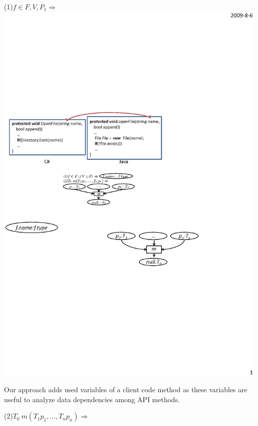 (1)$f\in F , V , P_1 \Rightarrow $
\includegraphics[scale=0.7,clip]{figure/rule1.eps}%

Our approach adds used variables of a client code method as these
variables are useful to analyze data dependencies among API methods.

(2)$T_0\ m (T_1 p_1, \ldots, T_n p_n) \Rightarrow $

